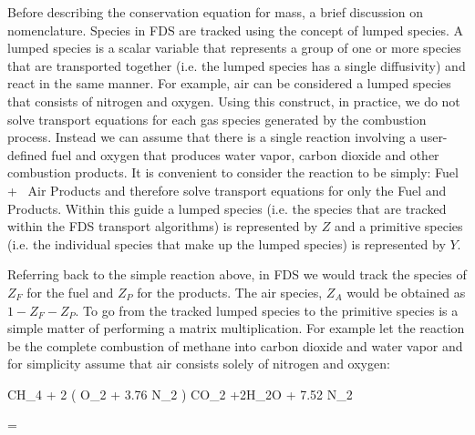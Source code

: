 Before describing the conservation equation for mass, a brief discussion on nomenclature.  Species in FDS are tracked using the concept of lumped species.  A lumped species is a scalar variable that represents a group of one or more species that are transported together (i.e. the lumped species has a single diffusivity) and react in the same manner.  For example, air can be considered a lumped species that consists of nitrogen and oxygen.  Using this construct, in practice, we do not solve transport equations for each gas species generated by the combustion process. Instead we can assume
that there is a single reaction involving a user-defined fuel and oxygen that produces water vapor, carbon dioxide and other
combustion products. It is convenient to consider the reaction to be simply:
\be \hbox{Fuel} + \nu \, \hbox{Air} \rightarrow \hbox{Products} \ee
and therefore solve transport equations for only the Fuel and Products.  Within this guide a lumped species (i.e. the species that are tracked within the FDS transport algorithms) is represented by $Z$ and a primitive species (i.e. the individual species that make up the lumped species) is represented by $Y$.

Referring back to the simple reaction above, in FDS we would track the species of $Z_F$ for the fuel and $Z_P$ for the products.  The air species, $Z_A$ would be obtained as $1 - Z_F - Z_P$.  To go from the tracked lumped species to the primitive species is a simple matter of performing a matrix multiplication.  For example let the reaction be the complete combustion of methane into carbon dioxide and water vapor and for simplicity assume that air consists solely of nitrogen and oxygen:

\be CH_4 + 2 \left( O_2 + 3.76 N_2 \right)  \rightarrow CO_2 +2H_2O + 7.52 N_2 \ee

\be \left[ \begin{array} {c c c}
0.77 & 0.00 & 0.73 \\
0.23 & 0.00 & 0.00 \\
0.00 & 1.00 & 0.00 \\
0.00 & 0.00 & 0.15 \\
0.00 & 0.00 & 0.12  \end{array}
\right]
\left[ \begin{array} {c} Z_A \\ Z_F \\ Z_P \end{array} \right] =
\left[ \begin{array} {c} Y_{N_2} \\ Y_{O_2} \\ Y_{CH_4} \\ Y_{CO_2} \\ Y_{H_2O} \end{array} \right] 
 \ee

